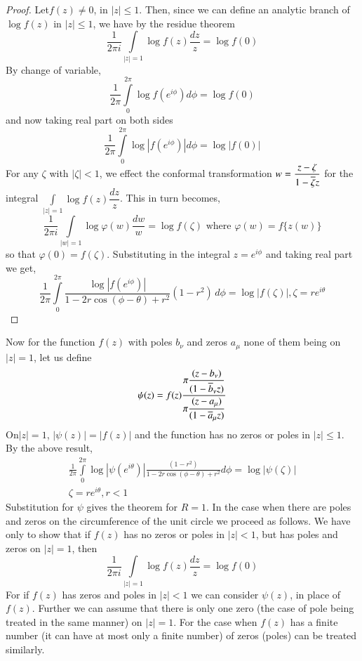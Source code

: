 \begin{proof}
Let\pageoriginale $f(z)\neq 0$, in $|z|\leq 1$. Then, since we can
define an analytic branch of $\log f(z)$ in $|z|\leq 1$, we have by
the residue theorem
$$
\frac{1}{2\pi i}\int\limits_{|z|=1}\log f(z)\frac{dz}{z}=\log f(0) 
$$
By change of variable,
$$
\frac{1}{2\pi}\int\limits^{2\pi}_{0}\log f(e^{i\phi})d\phi=\log f(0) 
$$ 
and now taking real part on both sides
$$
\frac{1}{2\pi}\int\limits^{2\pi}_{0}\log |f(e^{i\phi})|d\phi=\log|f(0)| 
$$
For any $\zeta$ with $|\zeta|<1$, we effect the conformal
transformation $w=\dfrac{z-\zeta}{1-\overline{\zeta}z}$ for the integral
$\int\limits_{|z|=1}\log f(z)\dfrac{dz}{z}$. This in turn becomes,
$$
\frac{1}{2\pi i}\int\limits_{|w|=1}\log \varphi(w)\dfrac{dw}{w}=\log
f(\zeta)\text{ \ where \ } \varphi(w)=f\{z(w)\}
$$
so that $\varphi(0)=f(\zeta)$. Substituting in the integral
$z=e^{i\phi}$ and taking real part we get,
$$ 
\frac{1}{2\pi}\int\limits^{2\pi}_{0}\frac{\log|f(e^{i\phi})|}{1-2r\cos
  (\phi-\theta)+r^{2}}(1-r^{2})\,d\phi=\log|f(\zeta)|,\zeta=re^{i\theta} 
$$
\end{proof}

Now for the function $f(z)$ with poles $b_{\nu}$ and zeros $a_{\mu}$
none of them being on $|z|=1$, let us define
$$
\psi(z)=f(z)\frac{\pi\dfrac{(z-b_{\nu})}{(1-\overline{b}_{\nu}z)}}{\pi\dfrac{(z-a_{\mu})}{(1-\overline{a}_{\mu}z)}}
$$
On\pageoriginale $|z|=1$, $|\psi(z)|=|f(z)|$ and the function has no
zeros or poles in $|z|\leq 1$. By the above result,
\begin{gather*}
\frac{1}{2\pi}\int\limits^{2\pi}_{0}\log|\psi(e^{i\theta})|\frac{(1-r^{2})}{1-2r\cos(\phi-\theta)+r^{2}}d\phi=\log|\psi(\zeta)|\\
\zeta=re^{i\theta},r<1
\end{gather*}
Substitution for $\psi$ gives the theorem for $R=1$. In the case when
there are poles and zeros on the circumference of the unit circle we
proceed as follows. We have only to show that if $f(z)$ has no zeros
or poles in $|z|<1$, but has poles and zeros on $|z|=1$, then
$$
\frac{1}{2\pi i}\int\limits_{|z|=1}\log f(z)\frac{dz}{z}=\log f(0)
$$
For if $f(z)$ has zeros and poles in $|z|<1$ we can consider
$\psi(z)$, in place of $f(z)$. Further we can assume that there is
only one zero (the case of pole being treated in the same manner) on
$|z|=1$. For the case when $f(z)$ has a finite number (it can have at
most only a finite number) of zeros (poles) can be treated similarly.


